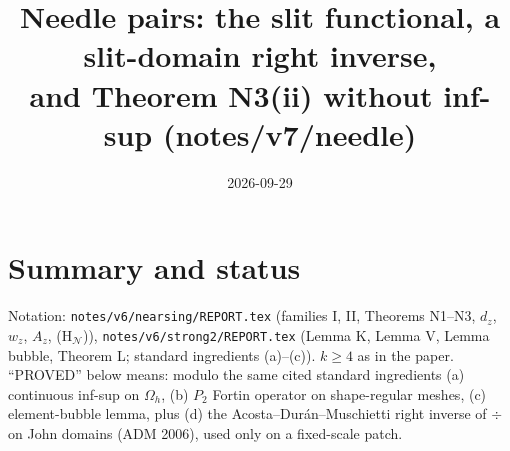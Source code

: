 \documentclass[11pt]{article}
\title{Needle pairs: the slit functional, a slit-domain right inverse,\\ and Theorem N3(ii) without inf-sup (notes/v7/needle)}
\date{2026-09-29}
\theoremstyle{remark}
\newcommand{\Nset}{\mathcal N}
\begin{document}
\sloppy
\maketitle

\section*{Summary and status}
Notation: \texttt{notes/v6/nearsing/REPORT.tex} (families I, II, Theorems N1--N3, $d_z$, $w_z$, $A_z$, (H$_\Nset$)),
\texttt{notes/v6/strong2/REPORT.tex} (Lemma K, Lemma V, Lemma bubble, Theorem L; standard ingredients (a)--(c)).
$k\ge4$ as in the paper. ``PROVED'' below means: modulo the same cited standard ingredients (a) continuous inf-sup on
$\Omega_h$, (b) $P_2$ Fortin operator on shape-regular meshes, (c) element-bubble lemma, plus (d) the
Acosta--Dur\'an--Muschietti right inverse of $\div$ on John domains (ADM 2006), used only on a fixed-scale patch.
\end{document}

